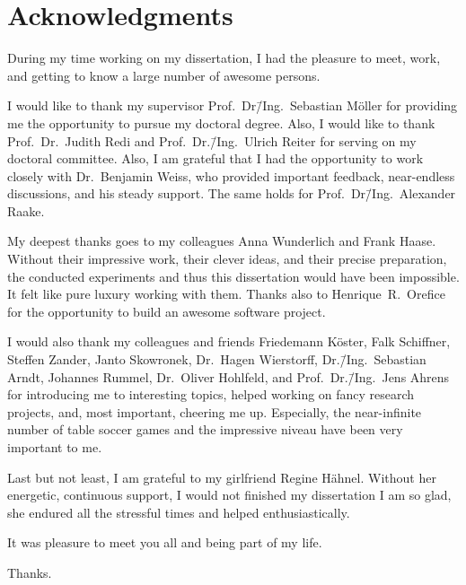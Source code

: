 
\bigskip

\begingroup
\let\clearpage\relax
\let\cleardoublepage\relax
\chapter*{Acknowledgments}
During my time working on my dissertation, I had the pleasure to meet, work, and getting to know a large number of awesome persons.

I would like to thank my supervisor Prof.~Dr\=/Ing.~Sebastian Möller for providing me the opportunity to pursue my doctoral degree.
Also, I would like to thank Prof.~Dr.~Judith Redi and Prof.~Dr.\=/Ing.~Ulrich Reiter for serving on my doctoral committee.
Also, I am grateful that I had the opportunity to work closely with Dr.~Benjamin Weiss, who provided important feedback, near-endless discussions, and his steady support.
The same holds for Prof.~Dr\=/Ing.~Alexander Raake.

My deepest thanks goes to my colleagues Anna Wunderlich and Frank Haase.
Without their impressive work, their clever ideas, and their precise preparation, the conducted experiments and thus this dissertation would have been impossible.
It felt like pure luxury working with them.
Thanks also to Henrique~R.~Orefice for the opportunity to build an awesome software project.

I would also thank my colleagues and friends Friedemann Köster, Falk Schiffner, Steffen Zander, Janto Skowronek, Dr.~Hagen Wierstorff, Dr.\=/Ing.~Sebastian Arndt, Johannes Rummel, Dr.~Oliver Hohlfeld, and Prof.~Dr.\=/Ing.~Jens Ahrens for introducing me to interesting topics, helped working on fancy research projects, and, most important, cheering me up.
Especially, the near-infinite number of table soccer games and the impressive niveau have been very important to me.

Last but not least, I am grateful to my girlfriend Regine Hähnel.
Without her energetic, continuous support, I would not finished my dissertation
I am so glad, she endured all the stressful times and helped enthusiastically.

\bigskip
It was pleasure to meet you all and being part of my life.

\bigskip
Thanks.

\endgroup
